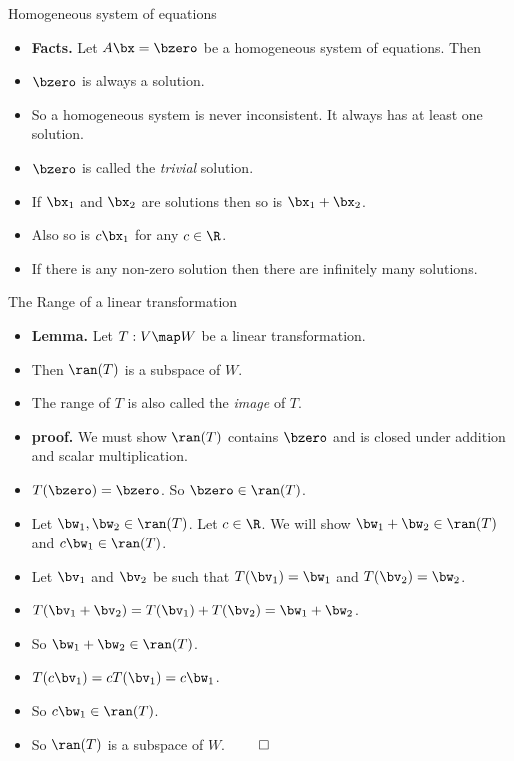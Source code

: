 \documentclass{beamer}
\begin{document}
\begin{frame}{Homogeneous system of equations}

\begin{itemize}
\item \textbf{Facts.} Let $A\bx=\bzero$ be a homogeneous system of equations. Then
\item $\bzero$ is always a solution.
\item So a homogeneous system is never inconsistent. It always has at least one solution.
\item $\bzero$ is called the \emph{trivial} solution.
\item If $\bx_1$ and $\bx_2$ are solutions then so is $\bx_1+\bx_2$.
\item Also so is $c\bx_1$ for any $c\in\R$.
\item If there is any non-zero solution then there are infinitely many solutions.
\end{itemize}

\end{frame}


\begin{frame}{The Range of a linear transformation}

\begin{itemize}
\item \textbf{Lemma.} Let $T:V\map W$ be a linear transformation.
\item Then $\ran(T)$ is a subspace of $W$.
\item The range of $T$ is also called the \emph{image} of $T$.
\item \textbf{proof.} We must show $\ran(T)$ contains $\bzero$ and is closed
under addition and scalar multiplication.
\item $T(\bzero) = \bzero$. So $\bzero\in\ran(T)$.
\item Let $\bw_1,\bw_2\in\ran(T)$. Let $c\in\R$. We will show $\bw_1+\bw_2\in\ran(T)$ and $c\bw_1\in\ran(T)$.
\item Let $\bv_1$ and $\bv_2$ be such that $T(\bv_1)=\bw_1$ and $T(\bv_2)=\bw_2$.
\item $T(\bv_1+\bv_2)=T(\bv_1) + T(\bv_2) = \bw_1+\bw_2$.
\item So $\bw_1+\bw_2\in\ran(T)$.
\item $T(c\bv_1)=cT(\bv_1)=c\bw_1$.
\item So $c\bw_1\in\ran(T)$.
\item So $\ran(T)$ is a subspace of $W$. $\qed$
\end{itemize}

\end{frame}
\end{document}
